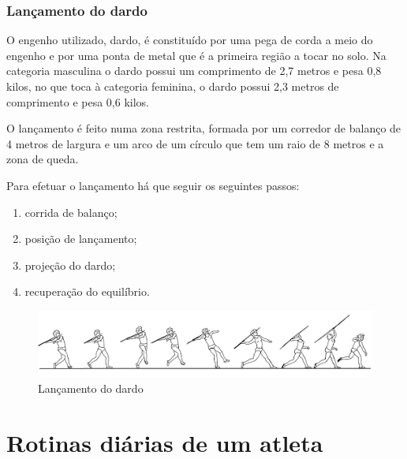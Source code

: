 \documentclass{report}
\begin{document}
    \subsection{Lançamento do dardo}
    O engenho utilizado, dardo, é constituído por uma pega de corda a meio do engenho e por uma ponta de metal que é a primeira região a tocar no solo. Na categoria masculina o dardo possui um comprimento de 2,7 metros e pesa 0,8 kilos, no que toca à categoria feminina, o dardo possui 2,3 metros de comprimento e pesa 0,6 kilos. \par
    O lançamento é feito numa zona restrita, formada por um corredor de balanço de 4 metros de largura e um arco de um círculo que tem um raio de 8 metros e a zona de queda.\par 
    Para efetuar o lançamento há que seguir os seguintes passos: 
    \begin{enumerate}
        \item
        corrida de balanço;
        \item
        posição de lançamento;
        \item
        projeção do dardo; 
        \item
        recuperação do equilíbrio.
    \end{enumerate} \cite{lancamentodopesodardo}
    
     \FloatBarrier
            \begin{figure}[h]
            \center
            \includegraphics[scale=.55,angle=0]{dardo.png}
            \caption{Lançamento do dardo}
            \label{fig:dardo.2}
            \end{figure}
    \FloatBarrier
    
    \chapter{Rotinas diárias de um atleta}
    \label{chap.Rotinasdiariasdeumatleta}
\end{document}
